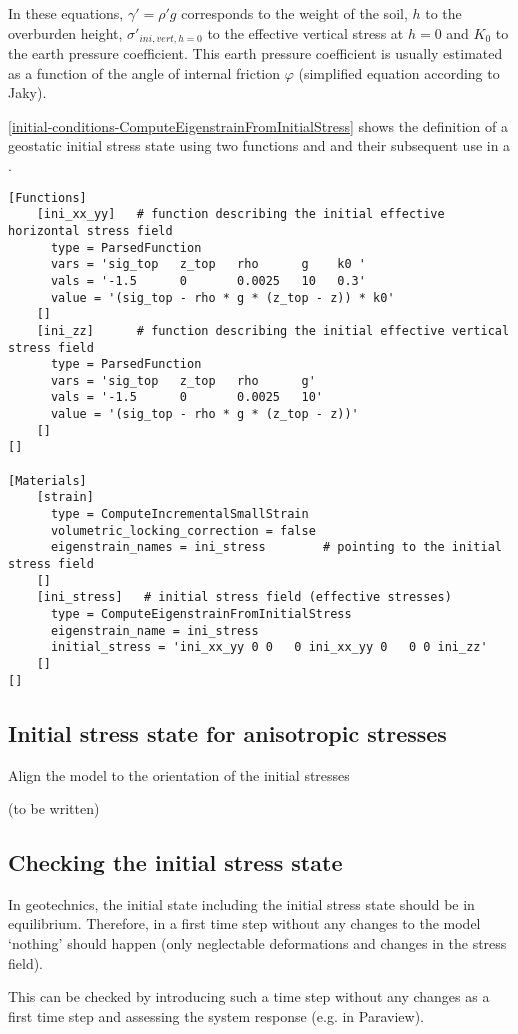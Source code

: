 In these equations, $\gamma'=\rho' g$ corresponds to the weight of the soil,
$h$ to the overburden height, $\sigma'_{ini,vert,h=0}$ to the effective
vertical stress at $h=0$ and $K_0$ to the earth pressure coefficient. This
earth pressure coefficient is usually estimated as a function of the angle of
internal friction $\varphi$ (simplified equation according to Jaky).

\autoref{initial-conditions-ComputeEigenstrainFromInitialStress} shows the
definition of a geostatic initial stress state using two functions
 and  and their subsequent use in a
.

\begin{lstlisting}[language=Moose, float, caption={Definition of a geostatic initial stress state using ‘ComputeEigenstrainFromInitialStress’ },label={initial-conditions-ComputeEigenstrainFromInitialStress}]
[Functions]
    [ini_xx_yy]   # function describing the initial effective horizontal stress field
      type = ParsedFunction
      vars = 'sig_top   z_top   rho      g    k0 '
      vals = '-1.5      0       0.0025   10   0.3'
      value = '(sig_top - rho * g * (z_top - z)) * k0'
    []
    [ini_zz]      # function describing the initial effective vertical stress field
      type = ParsedFunction
      vars = 'sig_top   z_top   rho      g'
      vals = '-1.5      0       0.0025   10'
      value = '(sig_top - rho * g * (z_top - z))'
    []
[]
  
[Materials]
    [strain]
      type = ComputeIncrementalSmallStrain
      volumetric_locking_correction = false
      eigenstrain_names = ini_stress        # pointing to the initial stress field
    []
    [ini_stress]   # initial stress field (effective stresses)
      type = ComputeEigenstrainFromInitialStress
      eigenstrain_name = ini_stress
      initial_stress = 'ini_xx_yy 0 0   0 ini_xx_yy 0   0 0 ini_zz'
    []
[]
\end{lstlisting}

\subsection{Initial stress state for anisotropic stresses}
\label{chap:IC-stress-state-anisotropic}

Align the model to the orientation of the initial stresses

(to be written)

\subsection{Checking the initial stress state}
\label{chap:IC-check}

In geotechnics, the initial state including the initial stress state should be
in equilibrium. Therefore, in a first time step without any changes to the
model ‘nothing’ should happen (only neglectable deformations and changes in the
stress field).

This can be checked by introducing such a time step without any changes as a
first time step and assessing the system response (e.g. in Paraview).
